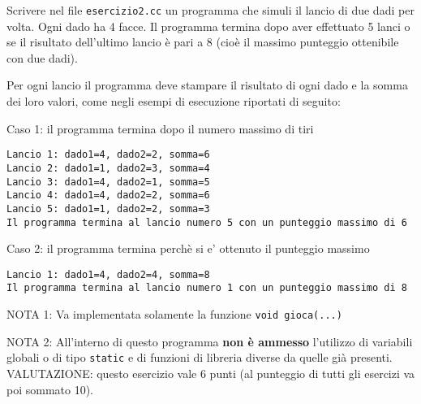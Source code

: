 %

Scrivere nel file {\tt esercizio2.cc} un programma che simuli il lancio di due dadi per volta. Ogni dado ha 4 facce. Il programma termina dopo aver effettuato 5 lanci o se il risultato dell'ultimo lancio \`e pari a 8 (cio\`e il massimo punteggio ottenibile con due dadi).

Per ogni lancio il programma deve stampare il risultato di ogni dado e la somma dei loro valori, come negli esempi di esecuzione riportati di seguito:

Caso 1: il programma termina dopo il numero massimo di tiri
\begin{verbatim}
Lancio 1: dado1=4, dado2=2, somma=6
Lancio 2: dado1=1, dado2=3, somma=4
Lancio 3: dado1=4, dado2=1, somma=5
Lancio 4: dado1=4, dado2=2, somma=6
Lancio 5: dado1=1, dado2=2, somma=3
Il programma termina al lancio numero 5 con un punteggio massimo di 6
\end{verbatim}

Caso 2: il programma termina perch\`e si e' ottenuto il punteggio massimo
\begin{verbatim}
Lancio 1: dado1=4, dado2=4, somma=8
Il programma termina al lancio numero 1 con un punteggio massimo di 8
\end{verbatim}

\vspace{.5cm}

NOTA 1: Va implementata solamente la funzione \verb|void gioca(...)|

NOTA 2: All'interno di questo programma {\bf non \`e ammesso} 
l'utilizzo di variabili globali o di tipo {\tt static} e di 
funzioni di libreria diverse da quelle gi\`a presenti. \\

VALUTAZIONE:
questo esercizio vale 6 punti (al punteggio di tutti gli esercizi va poi sommato 10).

%



